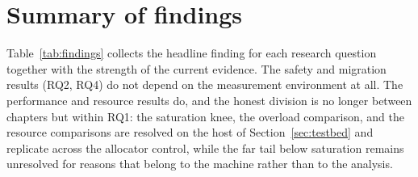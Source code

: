 \documentclass[english,twoside,openright,a4paper,censored,csm,software-track-2020]{HYthesisML}
\begin{document}
\section{Summary of findings}
Table~\ref{tab:findings} collects the headline finding for each research question together with the
strength of the current evidence. The safety and migration results (RQ2, RQ4) do not depend on the
measurement environment at all. The performance and resource results do, and the honest division
is no longer between chapters but within RQ1: the saturation knee, the overload comparison, and the
resource comparisons are resolved on the host of Section~\ref{sec:testbed} and replicate across the
allocator control, while the far tail below saturation remains unresolved for reasons that belong
to the machine rather than to the analysis.
\end{document}
